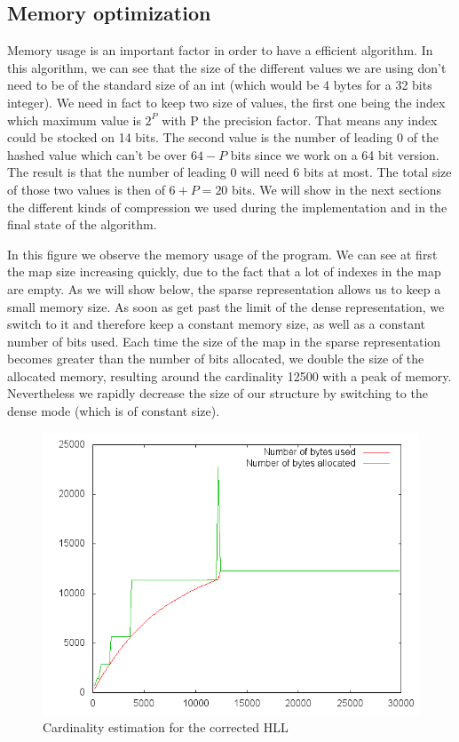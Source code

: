 \documentclass{article}
\begin{document}
\subsection{Memory optimization}
Memory usage is an important factor in order to have a efficient
algorithm. In this algorithm, we can see that the size of the
different values we are using don't need to be of the standard size of
an int (which would be 4 bytes for a 32 bits integer). We need in fact
to keep two size of values, the first one being the index which
maximum value is $2^{P}$ with P the precision factor. That means any
index could be stocked on 14 bits. The second value is the number of
leading 0 of the hashed value which can't be over $64-P$ bits since we
work on a 64 bit version. The result is that the number of leading 0
will need 6 bits at most. The total size of those two values is then
of $6+P = 20$ bits. We will show in the next sections the different
kinds of compression we used during the implementation and in the
final state of the algorithm.

In this figure we observe the memory usage of the program. We can see
at first the map size increasing quickly, due to the fact that a lot
of indexes in the map are empty. As we will show below, the sparse
representation allows us to keep a small memory size. As soon as get
past the limit of the dense representation, we switch to it and
therefore keep a constant memory size, as well as a constant number of
bits used. Each time the size of the map in the sparse representation
becomes greater than the number of bits allocated, we double the size
of the allocated memory, resulting around the cardinality 12500 with a
peak of memory. Nevertheless we rapidly decrease the size of our
structure by switching to the dense mode (which is of constant
size).\\
 
 
\begin{center}
\begin{figure}[h]
\includegraphics[scale=0.7]{plot_memoryUsage.png}
\caption{Cardinality estimation for the corrected HLL}
\end{figure}
\end{center}
\end{document}
